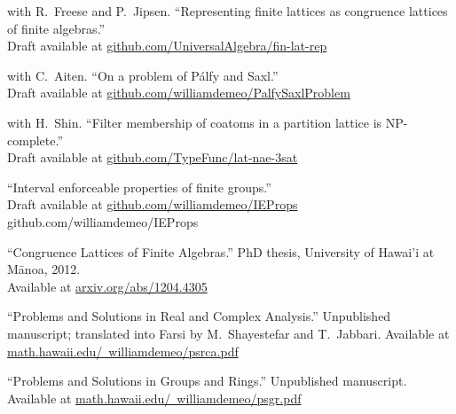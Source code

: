 \documentclass{article}
\begin{document}
\begin{thebibliography}{10}
       
  with R.~Freese and P.~Jipsen.
  \newblock ``Representing finite lattices as congruence lattices of finite algebras.''\\
  \newblock Draft available at
  \href{https://github.com/UniversalAlgebra/fin-lat-rep}
       {{\small github.com/UniversalAlgebra/fin-lat-rep}}

  with C.~Aiten.
  \newblock ``On a problem of P\'{a}lfy and Saxl.''\\
  \newblock Draft available at
  \href{https://github.com/williamdemeo/PalfySaxlProblem}
       {{\small github.com/williamdemeo/PalfySaxlProblem}}

  with H.~Shin.
  \newblock ``Filter membership of coatoms in a partition lattice is NP-complete.''\\
  \newblock Draft available at
  \href{https://github.com/TypeFunc/lat-nae-3sat}
       {{\small github.com/TypeFunc/lat-nae-3sat}}

  \newblock ``Interval enforceable properties of finite groups.''\\
  \newblock Draft available at
  \href{https://github.com/williamdemeo/IEProps}{github.com/williamdemeo/IEProps}
       {{\small github.com/williamdemeo/IEProps}}

\end{thebibliography}

\renewcommand{\refname}{\normalsize Other}
  
\begin{thebibliography}{10}
       
  \newblock ``Congruence Lattices of Finite Algebras.''
  \newblock PhD thesis, {U}niversity of {H}awai'i at {M}\={a}noa, 2012.\\
  \newblock Available at
  \href{http://arxiv.org/abs/1204.4305}
       {{\small arxiv.org/abs/1204.4305}}

  \newblock ``Problems and Solutions in Real and Complex Analysis.''
  \newblock Unpublished manuscript; translated into Farsi by
  M.~Shayestefar and T.~Jabbari.
  \newblock Available at
  \href{http://math.hawaii.edu/~williamdemeo/psrca.pdf}
       {{\small math.hawaii.edu/~williamdemeo/psrca.pdf}}

  \newblock ``Problems and Solutions in Groups and Rings.''
  \newblock Unpublished manuscript.\\
  \newblock Available at
  \href{http://math.hawaii.edu/~williamdemeo/psgr.pdf}
       {{\small math.hawaii.edu/~williamdemeo/psgr.pdf}}

\end{thebibliography}
\end{document}

